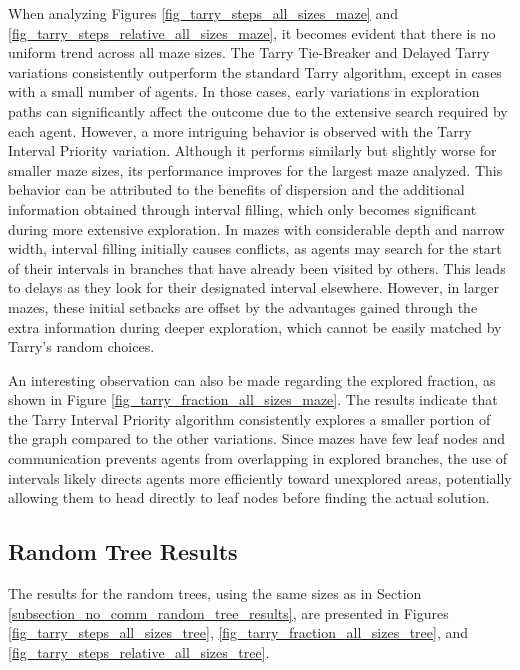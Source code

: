 When analyzing Figures \ref{fig_tarry_steps_all_sizes_maze} and \ref{fig_tarry_steps_relative_all_sizes_maze}, it becomes evident that there is no uniform trend across all maze sizes. The Tarry Tie-Breaker and Delayed Tarry variations consistently outperform the standard Tarry algorithm, except in cases with a small number of agents. In those cases, early variations in exploration paths can significantly affect the outcome due to the extensive search required by each agent. However, a more intriguing behavior is observed with the Tarry Interval Priority variation. Although it performs similarly but slightly worse for smaller maze sizes, its performance improves for the largest maze analyzed. This behavior can be attributed to the benefits of dispersion and the additional information obtained through interval filling, which only becomes significant during more extensive exploration. In mazes with considerable depth and narrow width, interval filling initially causes conflicts, as agents may search for the start of their intervals in branches that have already been visited by others. This leads to delays as they look for their designated interval elsewhere. However, in larger mazes, these initial setbacks are offset by the advantages gained through the extra information during deeper exploration, which cannot be easily matched by Tarry's random choices.

An interesting observation can also be made regarding the explored fraction, as shown in Figure \ref{fig_tarry_fraction_all_sizes_maze}. The results indicate that the Tarry Interval Priority algorithm consistently explores a smaller portion of the graph compared to the other variations. Since mazes have few leaf nodes and communication prevents agents from overlapping in explored branches, the use of intervals likely directs agents more efficiently toward unexplored areas, potentially allowing them to head directly to leaf nodes before finding the actual solution.


\subsection{Random Tree Results} 
\label{subsection_tarry_random_tree_results}


The results for the random trees, using the same sizes as in Section \ref{subsection_no_comm_random_tree_results}, are presented in Figures \ref{fig_tarry_steps_all_sizes_tree}, \ref{fig_tarry_fraction_all_sizes_tree}, and \ref{fig_tarry_steps_relative_all_sizes_tree}.

